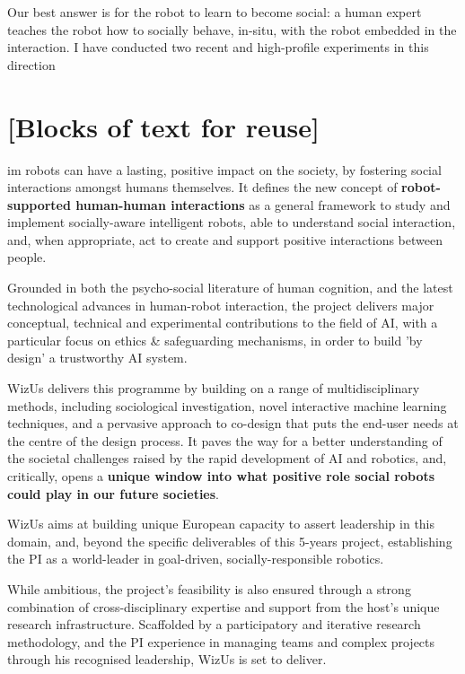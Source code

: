 \documentclass[11pt,a4paper]{report}
\newcommand{\project}{WizUs\xspace}
\begin{document}
Our best answer is for the robot to learn to become social: a human expert teaches
the robot how to socially behave, in-situ, with the robot embedded in the
interaction. I have conducted two recent and high-profile experiments in this
direction


\section{[Blocks of text for reuse]}


im robots can have a lasting, positive
impact on the society, by fostering social interactions amongst humans
themselves. It defines the new concept of \textbf{robot-supported human-human
interactions} as a general framework to study and implement socially-aware
intelligent robots, able to understand social interaction, and, when
appropriate, act to create and support positive interactions between people.


Grounded in both the psycho-social literature of human cognition, and the latest
technological advances in human-robot interaction, the project delivers
major conceptual, technical and experimental contributions to the field of AI, 
with a particular focus on ethics \& safeguarding mechanisms, in order to build 'by 
design' a trustworthy AI system.

\project delivers this programme by building on a range of multidisciplinary
methods, including sociological investigation, novel interactive machine
learning techniques, and a pervasive approach to co-design that puts the
end-user needs at the centre of the design process. It paves the way for a
better understanding of the societal challenges raised by the rapid development
of AI and robotics, and, critically, opens a \textbf{unique window into what
positive role social robots could play in our future societies}.




\project aims at building unique European capacity to assert leadership in this
domain, and, beyond the specific deliverables of this 5-years project,
establishing the PI as a world-leader in goal-driven, socially-responsible
robotics.



While ambitious, the project's feasibility is also ensured through a strong
combination of cross-disciplinary expertise and support from the host's unique
research infrastructure. Scaffolded by a participatory and iterative research
methodology, and the PI experience in managing teams and complex projects
through his recognised leadership, \project is set to deliver.
\end{document}
